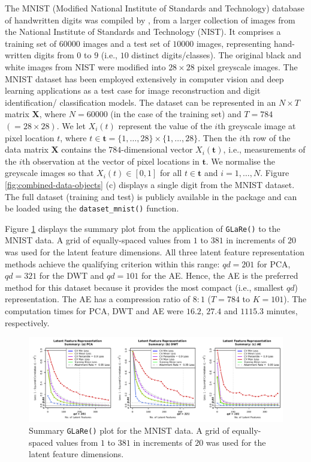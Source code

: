 The MNIST (Modified National Institute of Standards and Technology) database of handwritten digits was compiled by \textcite{lecun_mnist_1998}, from a larger collection of images from the National Institute of Standards and Technology (NIST).
It comprises a training set of $60000$ images and a test set of $10000$ images, representing hand-written digits from $0$ to $9$ (i.e., $10$ distinct digits/classes).
The original black and white images from NIST were modified into $28 \times 28$ pixel greyscale images.
The MNIST dataset has been employed extensively in computer vision and deep learning applications as a test case for image reconstruction and digit identification/ classification models.
The dataset can be represented in an $N \times T$ matrix $\mathbf{X}$, where $N = 60000$ (in the case of the training set) and $T= 784$ $(= 28 \times 28)$.
We let $X_i(t)$ represent the value of the $i$th greyscale image at pixel location $t$, where $t \in \mathbf{t} = \{1, \dots, 28\} \times \{1, \dots, 28\}$.
Then the $i$th row of the data matrix $\mathbf{X}$ contains the $784$-dimensional vector $X_i(\mathbf{t})$, i.e., measurements of the $i$th observation at the vector of pixel locations in $\mathbf{t}$.
We normalise the greyscale images so that $X_i(t) \in [0, 1]$ for all $t \in \mathbf{t}$ and $i = 1, \dots, N$. 
Figure \ref{fig:combined-data-objects} (c) displays a single digit from the MNIST dataset.
The full dataset (training and test) is publicly available in the   package \parencite{kalinowski_keras_2024} and can be loaded using the \texttt{dataset\_mnist()} function.

Figure \ref{fig:mnist-results} displays the summary plot from the application of \texttt{GLaRe()} to the MNIST data.
A grid of equally-spaced values from $1$ to $381$ in increments of $20$ was used for the latent feature dimensions.
All three latent feature representation methods achieve the qualifying criterion within this range: $qd = 201$ for PCA, $qd = 321$ for the DWT and $qd = 101$ for the AE.
Hence, the AE is the preferred method for this dataset because it provides the most compact (i.e., smallest $qd$) representation.
The AE has a compression ratio of $8:1$ ($T = 784$ to $K = 101$).
The computation times for PCA, DWT and AE were $16.2$, $27.4$ and $1115.3$ minutes, respectively.

\begin{figure}
    \centering
    \includegraphics[width=1\linewidth]{figures/mnist-results.pdf}
    \caption{Summary \texttt{GLaRe()} plot for the MNIST data. A grid of equally-spaced values from $1$ to $381$ in increments of $20$ was used for the latent feature dimensions.}
    \label{fig:mnist-results}
\end{figure}


